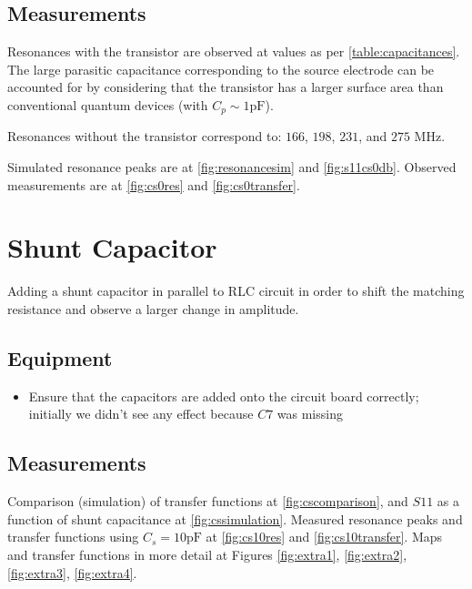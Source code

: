 \documentclass{article}
\begin{document}
\begin{multicols*}{2}
    \subsection{Measurements}

    \noindent Resonances with the transistor are observed at values as per \autoref{table:capacitances}. The large parasitic capacitance corresponding to the source electrode can be accounted for by considering that the transistor has a larger surface area than conventional quantum devices (with $C_p \sim 1\si{\pico\farad}$).

    \noindent Resonances without the transistor correspond to: $166$, $198$, $231$, and $275$ MHz.

    Simulated resonance peaks are at \autoref{fig:resonancesim} and \ref{fig:s11cs0db}. Observed measurements are at \autoref{fig:cs0res} and \ref{fig:cs0transfer}.

    \section{Shunt Capacitor}

    Adding a shunt capacitor in parallel to RLC circuit in order to shift the matching resistance and observe a larger change in amplitude. 

    \subsection{Equipment}

    \begin{itemize}
        \item Ensure that the capacitors are added onto the circuit board correctly; initially we didn't see any effect because $C7$ was missing
    \end{itemize}

    \subsection{Measurements}

    Comparison (simulation) of transfer functions at \autoref{fig:cscomparison}, and $S11$ as a function of shunt capacitance at \autoref{fig:cssimulation}. Measured resonance peaks and transfer functions using $C_s = 10\si{\pico\farad}$ at \autoref{fig:cs10res} and \ref{fig:cs10transfer}. Maps and transfer functions in more detail at Figures \ref{fig:extra1}, \ref{fig:extra2}, \ref{fig:extra3}, \ref{fig:extra4}.


\end{multicols*}
\end{document}
